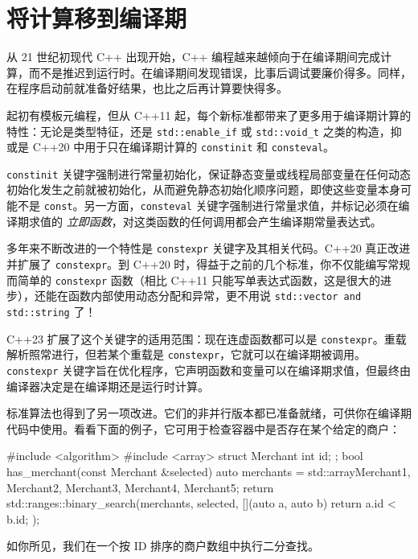 \section{将计算移到编译期}

\label{idx:500}
从 21 世纪初现代 C++ 出现开始，C++ 编程越来越倾向于在编译期间完成计算，而不是推迟到运行时。在编译期间发现错误，比事后调试要廉价得多。同样，在程序启动前就准备好结果，也比之后再计算要快得多。

起初有模板元编程，但从 C++11 起，每个新标准都带来了更多用于编译期计算的特性：无论是类型特征，还是 \texttt{std::\allowbreak{}enable\_\allowbreak{}if} 或 \texttt{std::\allowbreak{}void\_\allowbreak{}t} 之类的构造，抑或是 C++20 中用于只在编译期计算的 \texttt{constinit} 和 \texttt{consteval}。

\texttt{constinit} 关键字强制进行常量初始化，保证静态变量或线程局部变量在任何动态初始化发生之前就被初始化，从而避免静态初始化顺序问题，即使这些变量本身可能不是 \texttt{const}。另一方面，\texttt{consteval} 关键字强制进行常量求值，并标记必须在编译期求值的 \emph{立即函数}，对这类函数的任何调用都会产生编译期常量表达式。

多年来不断改进的一个特性是 \texttt{constexpr} 关键字及其相关代码。C++20 真正改进并扩展了 \texttt{constexpr}。到 C++20 时，得益于之前的几个标准，你不仅能编写常规而简单的 \texttt{constexpr} 函数（相比 C++11 只能写单表达式函数，这是很大的进步），还能在函数内部使用动态分配和异常，更不用说 \texttt{std::\allowbreak{}vector and std::\allowbreak{}string} 了！

C++23 扩展了这个关键字的适用范围：现在连虚函数都可以是 \texttt{constexpr}。重载解析照常进行，但若某个重载是 \texttt{constexpr}，它就可以在编译期被调用。\texttt{constexpr} 关键字旨在优化程序，它声明函数和变量可以在编译期求值，但最终由编译器决定是在编译期还是运行时计算。

标准算法也得到了另一项改进。它们的非并行版本都已准备就绪，可供你在编译期代码中使用。看看下面的例子，它可用于检查容器中是否存在某个给定的商户：

\begin{codebox}[cpp]
#include <algorithm>
#include <array>
struct Merchant { int id; };
bool has_merchant(const Merchant &selected) {
    auto merchants = std::array{Merchant{1}, Merchant{2}, Merchant{3}, Merchant{4}, Merchant{5}};
    return std::ranges::binary_search(merchants, selected, [](auto a, auto b) { return a.id < b.id; });
}
\end{codebox}

如你所见，我们在一个按 ID 排序的商户数组中执行二分查找。

